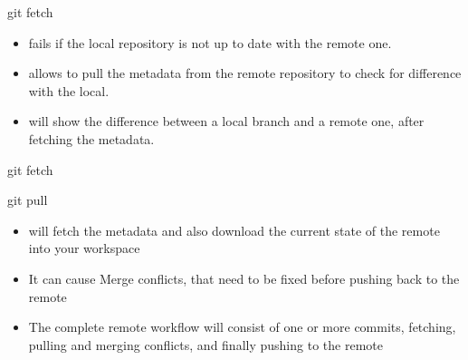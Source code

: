 \begin{frame}[fragile]{git fetch}
    \begin{itemize}[<+->] 
        \item {} fails if the local repository is not up to date with the remote one.
        \item {} allows to pull the metadata from the remote repository to check for difference with the local.
        \item {} will show the difference between a local branch and a remote one, after fetching the metadata.
    \end{itemize}
\end{frame}

\begin{frame}[fragile]{git fetch \insertcontinuationtext}
\end{frame}

\begin{frame}[fragile]{git pull}
    \begin{itemize}[<+->] 
        \item {} will fetch the metadata and also download the current state of the remote into your workspace
        \item It can cause Merge conflicts, that need to be fixed before pushing back to the remote
        \item The complete remote workflow will consist of one or more \alert{commits}, \alert{fetching}, \alert{pulling} and \alert{merging conflicts}, and finally \alert{pushing} to the remote
    \end{itemize}
\end{frame}

